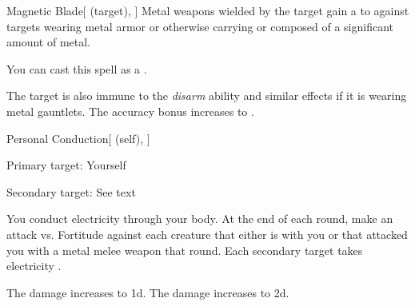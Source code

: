 \lowercase{\hypertarget{spell:Magnetic Blade}{}}\label{spell:Magnetic Blade}
\begin{attuneability}[Rank 3]{\hypertarget{spell:Magnetic Blade}{Magnetic Blade}}[ (target), ]
Metal weapons wielded by the target gain a   to  against targets wearing metal armor or otherwise carrying or composed of a significant amount of metal.

You can cast this spell as a .

\rankline
{} The target is also immune to the \textit{disarm} ability and similar effects if it is wearing metal gauntlets.
 The accuracy bonus increases to .
\end{attuneability}
\vspace{0.25em}



\lowercase{\hypertarget{spell:Personal Conduction}{}}\label{spell:Personal Conduction}
\begin{attuneability}[Rank 3]{\hypertarget{spell:Personal Conduction}{Personal Conduction}}[ (self), ]

Primary target: Yourself
\par\noindent
Secondary target: See text

You conduct electricity through your body.
At the end of each round, make an attack vs. Fortitude against each creature that either is  with you or that attacked you with a metal melee weapon that round.
\hit Each secondary target takes electricity .

\rankline
{} The damage increases to  \plus1d.
 The damage increases to  \plus2d.
\end{attuneability}
\vspace{0.25em}



